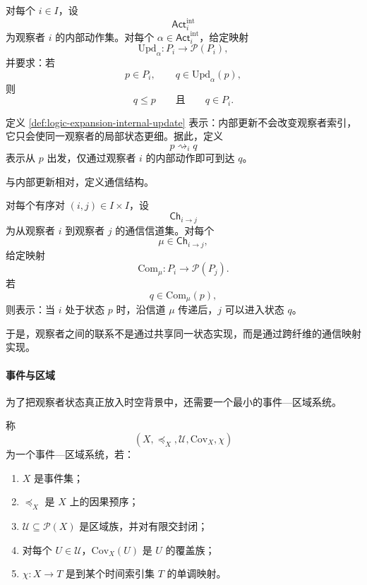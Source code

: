 \begin{definition}[内部更新]\label{def:logic-expansion-internal-update}
对每个 \(i\in I\)，设
\[
\mathsf{Act}_i^{\mathrm{int}}
\]
为观察者 \(i\) 的内部动作集。对每个 \(\alpha\in \mathsf{Act}_i^{\mathrm{int}}\)，给定映射
\[
\mathrm{Upd}_\alpha:P_i\to \mathcal P(P_i),
\]
并要求：若
\[
p\in P_i,
\qquad
q\in \mathrm{Upd}_\alpha(p),
\]
则
\[
q\le p
\qquad\text{且}\qquad
q\in P_i.
\]
\end{definition}

定义 \ref{def:logic-expansion-internal-update} 表示：内部更新不会改变观察者索引，它只会使同一观察者的局部状态更细。据此，定义
\[
p\rightsquigarrow_i q
\]
表示从 \(p\) 出发，仅通过观察者 \(i\) 的内部动作即可到达 \(q\)。

与内部更新相对，定义通信结构。

\begin{definition}[通信]\label{def:logic-expansion-communication}
对每个有序对 \((i,j)\in I\times I\)，设
\[
\mathsf{Ch}_{i\to j}
\]
为从观察者 \(i\) 到观察者 \(j\) 的通信信道集。对每个
\[
\mu\in \mathsf{Ch}_{i\to j},
\]
给定映射
\[
\mathrm{Com}_\mu:P_i\to \mathcal P(P_j).
\]
若
\[
q\in \mathrm{Com}_\mu(p),
\]
则表示：当 \(i\) 处于状态 \(p\) 时，沿信道 \(\mu\) 传递后，\(j\) 可以进入状态 \(q\)。
\end{definition}

于是，观察者之间的联系不是通过共享同一状态实现，而是通过跨纤维的通信映射实现。

\paragraph{事件与区域}
为了把观察者状态真正放入时空背景中，还需要一个最小的事件—区域系统。

\begin{definition}[事件—区域系统]\label{def:logic-expansion-event-region-system}
称
\[
(X,\preceq_X,\mathcal U,\mathrm{Cov}_X,\chi)
\]
为一个事件—区域系统，若：
\begin{enumerate}
  \item \(X\) 是事件集；
  \item \(\preceq_X\) 是 \(X\) 上的因果预序；
  \item \(\mathcal U\subseteq \mathcal P(X)\) 是区域族，并对有限交封闭；
  \item 对每个 \(U\in \mathcal U\)，\(\mathrm{Cov}_X(U)\) 是 \(U\) 的覆盖族；
  \item \(\chi:X\to T\) 是到某个时间索引集 \(T\) 的单调映射。
\end{enumerate}
\end{definition}

